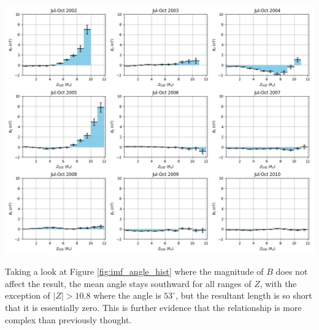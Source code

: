 \documentclass[12pt]{article}
\newenvironment{Figure}
  {\par\medskip\noindent\minipage{\linewidth}}
  {\endminipage\par\medskip}
\begin{document}
\begin{Figure}
    \centering
    \includegraphics[width=\textwidth]{indiv_months_imf_with_z.png}
    \label{fig:indiv_months_imf_with_z}
\end{Figure}

Taking a look at Figure \ref{fig:imf_angle_hist} where the magnitude of $B$ does not affect the result, the mean angle stays southward for all ranges of $Z$, with the exception of $|Z|>10.8$ where the angle is $53^\circ$, but the resultant length is so short that it is essentially zero. This is further evidence that the relationship is more complex than previously thought.
\end{document}
